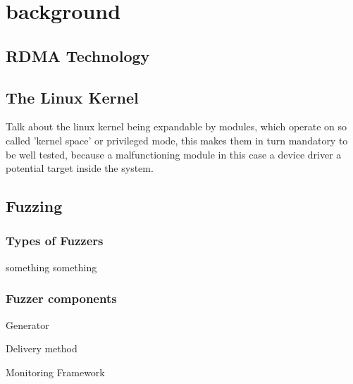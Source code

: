 \section{background}



\subsection{RDMA Technology}


\subsection{The Linux Kernel}
Talk about the linux kernel being expandable by modules, which operate on
so called 'kernel space' or privileged mode, this makes them in turn mandatory
to be well tested, because  a malfunctioning module in this case a device 
driver a potential target inside the system.

\subsection{Fuzzing}

\subsubsection{Types of Fuzzers}
 
something something \cite{fetzer20}


\subsubsection{Fuzzer components}

Generator

Delivery method

Monitoring Framework

